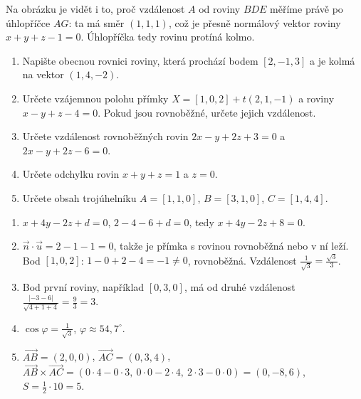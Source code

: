 \begin{center}
\end{center}
Na obrázku je vidět i to, proč vzdálenost $A$ od roviny $BDE$ měříme právě po úhlopříčce $AG$: ta má směr $(1, 1, 1)$, což je přesně normálový vektor roviny $x + y + z - 1 = 0$. Úhlopříčka tedy rovinu protíná kolmo.

\begin{problem}
  \begin{enumerate}[label=(\alph*)]
    \item Napište obecnou rovnici roviny, která prochází bodem $[2, -1, 3]$ a je kolmá na vektor $(1, 4, -2)$.
    \item Určete vzájemnou polohu přímky $X = [1, 0, 2] + t(2, 1, -1)$ a roviny $x - y + z - 4 = 0$. Pokud jsou rovnoběžné, určete jejich vzdálenost.
    \item Určete vzdálenost rovnoběžných rovin $2x - y + 2z + 3 = 0$ a $2x - y + 2z - 6 = 0$.
    \item Určete odchylku rovin $x + y + z = 1$ a $z = 0$.
    \item Určete obsah trojúhelníku $A = [1, 1, 0]$, $B = [3, 1, 0]$, $C = [1, 4, 4]$.
  \end{enumerate}
\end{problem}

\begin{solution}
  \begin{enumerate}[label=(\alph*)]
    \item $x + 4y - 2z + d = 0$, $2 - 4 - 6 + d = 0$, tedy $x + 4y - 2z + 8 = 0$.
    \item $\vec{n}\cdot\vec{u} = 2 - 1 - 1 = 0$, takže je přímka s rovinou rovnoběžná nebo v ní leží. Bod $[1, 0, 2]$: $1 - 0 + 2 - 4 = -1\neq 0$, rovnoběžná. Vzdálenost $\frac{1}{\sqrt{3}} = \frac{\sqrt{3}}{3}$.
    \item Bod první roviny, například $[0, 3, 0]$, má od druhé vzdálenost $\frac{|-3 - 6|}{\sqrt{4 + 1 + 4}} = \frac{9}{3} = 3$.
    \item $\cos\varphi = \frac{1}{\sqrt{3}}$, $\varphi\approx 54{,}7^\circ$.
    \item $\overrightarrow{AB} = (2, 0, 0)$, $\overrightarrow{AC} = (0, 3, 4)$, $\overrightarrow{AB}\times\overrightarrow{AC} = (0\cdot 4 - 0\cdot 3,\ 0\cdot 0 - 2\cdot 4,\ 2\cdot 3 - 0\cdot 0) = (0, -8, 6)$, $S = \frac{1}{2}\cdot 10 = 5$.
  \end{enumerate}
\end{solution}

